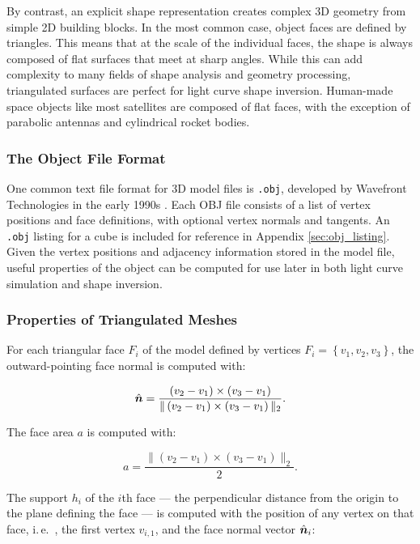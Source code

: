By contrast, an explicit shape representation creates complex 3D geometry from simple 2D building blocks. In the most common case, object faces are defined by triangles. This means that at the scale of the individual faces, the shape is always composed of flat surfaces that meet at sharp angles. While this can add complexity to many fields of shape analysis and geometry processing, triangulated surfaces are perfect for light curve shape inversion. Human-made space objects like most satellites are composed of flat faces, with the exception of parabolic antennas and cylindrical rocket bodies.

\subsubsection{The Object File Format}

One common text file format for 3D model files is \texttt{.obj}, developed by Wavefront Technologies in the early 1990s \cite{obj_format}. Each OBJ file consists of a list of vertex positions and face definitions, with optional vertex normals and tangents. An \texttt{.obj} listing for a cube is included for reference in Appendix \ref{sec:obj_listing}. Given the vertex positions and adjacency information stored in the model file, useful properties of the object can be computed for use later in both light curve simulation and shape inversion. 

\subsubsection{Properties of Triangulated Meshes}

For each triangular face $F_i$ of the model defined by vertices $F_i = \left\{v_1, v_2, v_3\right\}$, the outward-pointing face normal is computed with:

\begin{equation} \label{eq:face_normal}
    \hat{\bm{n}} = \frac{\left( v_2 - v_1 \right) \times \left( v_3 - v_1 \right)}{\| \left( v_2 - v_1 \right) \times \left( v_3 - v_1 \right) \|_2}.
\end{equation}

The face area $a$ is computed with:

\begin{equation} \label{eq:face_areas}
    a = \frac{\| \left( v_2 - v_1 \right) \times \left( v_3 - v_1 \right)\|_2}{2}.
\end{equation}

The support $h_i$ of the $i$th face --- the perpendicular distance from the origin to the plane defining the face --- is computed with the position of any vertex on that face, i.\,e.\ , the first vertex $v_{i,1}$, and the face normal vector $\hat{\bm{n}}_i$:

